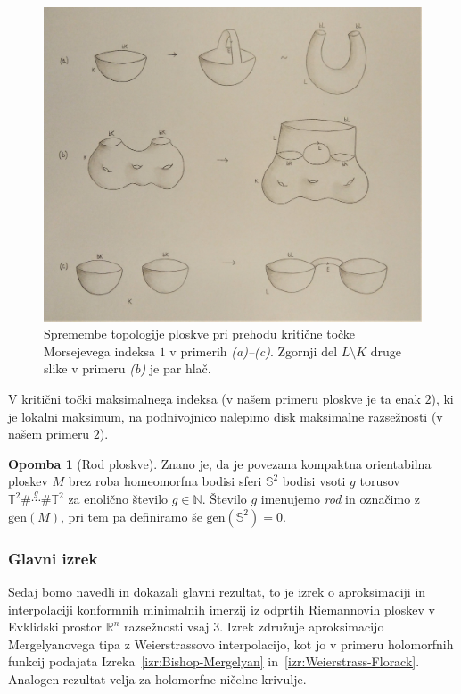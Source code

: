 \documentclass[12pt,a4paper,twoside]{article}
\theoremstyle{definition} %
\newtheorem{opomba}[definicija]{Opomba}
\theoremstyle{plain} %
\numberwithin{equation}{section}  %
\begin{document}
\begin{figure}[h!]
\begin{center}
\includegraphics[scale=0.12]{images/morse.jpg}
\caption{Spremembe topologije ploskve pri prehodu kritične točke Morsejevega indeksa $1$ v primerih \textit{(a)--(c)}. Zgornji del $L \setminus K$ druge slike v primeru \textit{(b)} je par hlač.}
\end{center}
\end{figure}

V kritični točki maksimalnega indeksa (v našem primeru ploskve je ta enak $2$), ki je lokalni maksimum, na podnivojnico nalepimo disk maksimalne razsežnosti (v našem primeru $2$).

\begin{opomba} [Rod ploskve]
Znano je, da je povezana kompaktna orientabilna ploskev $M$ brez roba homeomorfna bodisi sferi $\mathbb{S}^{2}$ bodisi vsoti $g$ torusov 
$\mathbb{T}^{2} \# \stackrel{g}{\cdots} \# \mathbb{T}^{2}$ za enolično število $g \in \mathbb{N}$.
Število $g$ imenujemo \emph{rod} in označimo z $\text{gen}(M)$, pri tem pa definiramo še $\text{gen}(\mathbb{S}^{2}) = 0$.
\end{opomba}

\subsubsection{Glavni izrek}
%
Sedaj bomo navedli in dokazali glavni rezultat, to je izrek o aproksimaciji in interpolaciji konformnih minimalnih imerzij iz odprtih Riemannovih ploskev v Evklidski prostor $\mathbb{R}^{n}$ razsežnosti vsaj $3$. Izrek združuje aproksimacijo Mergelyanovega tipa z Weierstrassovo interpolacijo, kot jo v primeru holomorfnih funkcij podajata Izreka~\ref{izr:Bishop-Mergelyan} in~\ref{izr:Weierstrass-Florack}.
Analogen rezultat velja za holomorfne ničelne krivulje.
\end{document}
